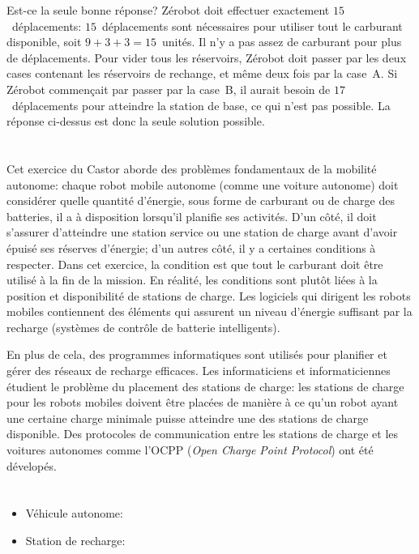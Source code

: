 {{Est-ce la seule bonne réponse? Zérobot doit effectuer exactement $15$~déplacements: $15$~déplacements sont nécessaires pour utiliser tout le carburant disponible, soit ${9 + 3 + 3 = 15}$~unités. Il n’y a pas assez de carburant pour plus de déplacements. Pour vider tous les réservoirs, Zérobot doit passer par les deux cases contenant les réservoirs de rechange, et même deux fois par la case~A. Si Zérobot commençait par passer par la case~B, il aurait besoin de $17$~déplacements pour atteindre la station de base, ce qui n’est pas possible. La réponse ci-dessus est donc la seule solution possible.



\section*{\BrochureItsInformatics}
Cet exercice du Castor aborde des problèmes fondamentaux de la mobilité autonome: chaque robot mobile autonome (comme une voiture autonome) doit considérer quelle quantité d’énergie, sous forme de carburant ou de charge des batteries, il a à disposition lorsqu’il planifie ses activités. D’un côté, il doit s’assurer d’atteindre une station service ou une station de charge avant d’avoir épuisé ses réserves d’énergie; d’un autres côté, il y a certaines conditions à respecter. Dans cet exercice, la condition est que tout le carburant doit être utilisé à la fin de la mission. En réalité, les conditions sont plutôt liées à la position et disponibilité de stations de charge. Les logiciels qui dirigent les robots mobiles contiennent des éléments qui assurent un niveau d’énergie suffisant par la recharge (systèmes de contrôle de batterie intelligents).

En plus de cela, des programmes informatiques sont utilisés pour planifier et gérer des réseaux de recharge efficaces. Les informaticiens et informaticiennes étudient le problème du placement des stations de charge: les stations de charge pour les robots mobiles doivent être placées de manière à ce qu’un robot ayant une certaine charge minimale puisse atteindre une des stations de charge disponible. Des protocoles de communication entre les stations de charge et les voitures autonomes comme l’OCPP (\emph{Open Charge Point Protocol}) ont été dévelopés.



\section*{\BrochureWebsitesAndKeywords}
{\raggedright
\begin{itemize}
  \item Véhicule autonome: \href{https://fr.wikipedia.org/wiki/V\%C3\%A9hicule_autonome}{}
  \item Station de recharge: \href{https://fr.wikipedia.org/wiki/Station_de_recharge\#Infrastructures_de_recharge}{}
\end{itemize}


}}}

